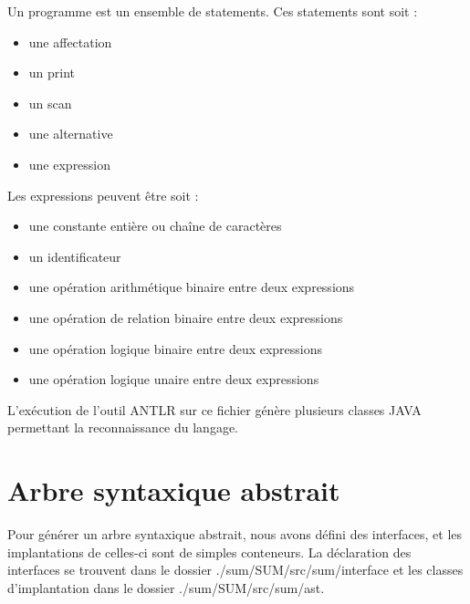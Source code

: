 \documentclass[a4paper,12pt]{report}
\begin{document}
Un programme est un ensemble de statements. Ces statements sont soit :
\begin{itemize}
 \item une affectation
 \item un print
 \item un scan
 \item une alternative
 \item une expression
\end{itemize}
Les expressions peuvent être soit :
\begin{itemize}
 \item une constante entière ou chaîne de caractères
 \item un identificateur
 \item une opération arithmétique binaire entre deux expressions
 \item une opération de relation binaire entre deux expressions
 \item une opération logique binaire entre deux expressions
 \item une opération logique unaire entre deux expressions
\end{itemize}

L'exécution de l'outil ANTLR sur ce fichier génère plusieurs classes JAVA permettant la reconnaissance du langage.

\section{Arbre syntaxique abstrait}
Pour générer un arbre syntaxique abstrait, nous avons défini des interfaces, et les implantations de celles-ci sont de simples conteneurs.
La déclaration des interfaces se trouvent dans le dossier ./sum/SUM/src/sum/interface et les classes d'implantation dans le dossier
./sum/SUM/src/sum/ast.
\end{document}
